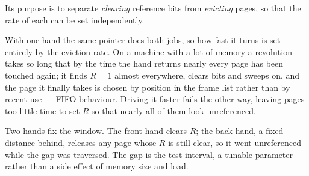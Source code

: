 Its purpose is to separate \emph{clearing} reference bits from \emph{evicting} pages,
so that the rate of each can be set independently.

With one hand the same pointer does both jobs, so how fast it turns is set entirely by
the eviction rate. On a machine with a lot of memory a revolution takes so long that by
the time the hand returns nearly every page has been touched again; it finds $R=1$
almost everywhere, clears bits and sweeps on, and the page it finally takes is chosen
by position in the frame list rather than by recent use --- FIFO behaviour. Driving it
faster fails the other way, leaving pages too little time to set $R$ so that nearly all
of them look unreferenced.

Two hands fix the window. The front hand clears $R$; the back hand, a fixed distance
behind, releases any page whose $R$ is still clear, so it went unreferenced while the
gap was traversed. The gap is the test interval, a tunable parameter rather than a side
effect of memory size and load.

\begin{center}
\end{center}

